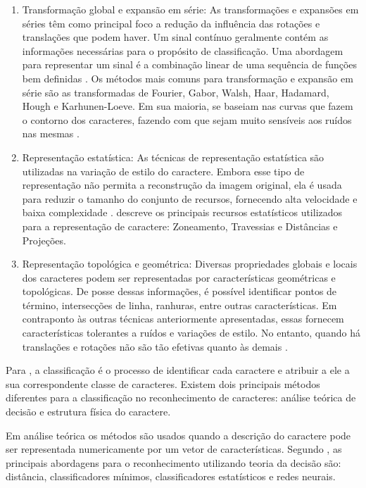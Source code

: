 \begin{enumerate}
	\item Transformação global e expansão em série: As transformações e expansões em séries têm como principal foco a
redução da influência das rotações e translações que podem haver. Um sinal contínuo geralmente contém as informações necessárias para o propósito de classificação. Uma abordagem para representar um sinal é a combinação linear de uma sequência de funções bem definidas \cite{Goswami2013}. Os métodos mais comuns para transformação e expansão em série são as transformadas de Fourier, Gabor, Walsh, Haar, Hadamard, Hough e Karhunen-Loeve. Em sua maioria, se baseiam nas curvas que fazem o contorno dos caracteres, fazendo com que sejam muito sensíveis aos ruídos nas mesmas \cite{Eikvil1993}.
	\item Representação estatística: As técnicas de representação estatística são utilizadas na variação de estilo do caractere. Embora esse tipo de representação não permita a reconstrução da imagem original, ela é usada para reduzir o tamanho do conjunto de recursos, fornecendo alta velocidade e baixa complexidade \cite{Eikvil1993}.  descreve os principais recursos estatísticos utilizados para a representação de caractere: Zoneamento, Travessias e Distâncias e Projeções.

	
	\item Representação topológica e geométrica: Diversas propriedades globais e locais dos caracteres podem ser representadas por características geométricas e topológicas. De posse dessas informações, é possível identificar pontos de término, intersecções de linha, ranhuras, entre outras características. Em contraponto às outras técnicas anteriormente apresentadas, essas fornecem características tolerantes a ruídos e variações de estilo. No entanto, quando há translações e rotações não são tão efetivas quanto às demais \cite{ANDRADE2016}. 
\end{enumerate}



Para , a classificação é o processo de identificar cada caractere e atribuir a ele a sua correspondente classe de caracteres. Existem dois principais métodos diferentes para a classificação no reconhecimento de caracteres: análise teórica de decisão e estrutura física do caractere. 


Em análise teórica os métodos são usados quando a descrição do caractere pode ser representada numericamente por um vetor de características. Segundo , as principais abordagens para o reconhecimento utilizando teoria da decisão são: distância, classificadores mínimos, classificadores estatísticos e redes neurais.

